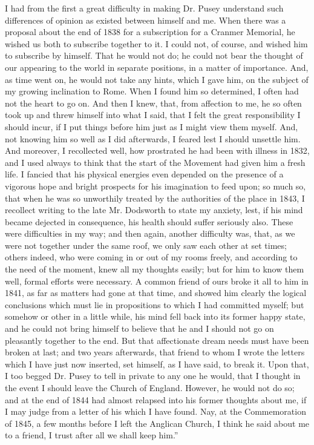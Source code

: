 I had from the first a great difficulty in making Dr. Pusey
understand such differences of opinion as existed between himself and
me. When there was a proposal about the end of 1838 for a subscription
for a Cranmer Memorial, he wished us both to subscribe together to it.
I could not, of course, and wished him to subscribe by himself. That he
would not do; he could not bear the thought of our appearing to the
world in separate positions, in a matter of importance. And, as time
went on, he would not take any hints, which I gave him, on the subject
of my growing inclination to Rome. When I found him so determined, I
often had not the heart to go on. And then I knew, that, from affection
to me, he so often took up and threw himself into what I said,
that I felt the great responsibility I should incur, if I put things
before him just as I might view them myself. And, not knowing
him so well as I did afterwards, I feared lest I should unsettle him.
And moreover, I recollected well, how prostrated he had been with
illness in 1832, and I used always to think that the start of the
Movement had given him a fresh life. I fancied that his physical
energies even depended on the presence of a vigorous hope and bright
prospects for his imagination to feed upon; so much so, that when he was
so unworthily treated by the authorities of the place in 1843, I
recollect writing to the late Mr. Dodsworth to state my anxiety, lest,
if his mind became dejected in consequence, his health should
suffer seriously also. These were difficulties in my way; and then
again, another difficulty was, that, as we were not together under the
same roof, we only saw each other at set times; others indeed, who were
coming in or out of my rooms freely, and according to the need of the moment, knew all my thoughts easily; but for him to know them
well, formal efforts were necessary. A common friend of ours broke it
all to him in 1841, as far as matters had gone at that time, and showed
him clearly the logical conclusions which must lie in propositions to
which I had committed myself; but somehow or other in a little while,
his mind fell back into its former happy state, and he could not bring
himself to believe that he and I should not go on pleasantly together to
the end. But that affectionate dream needs must have been broken at
last; and two years afterwards, that friend to whom I wrote the letters
which I have just now inserted, set himself, as I have said, to break
it. Upon that, I too begged Dr. Pusey to tell in private to any one he
would, that I thought in the event I should leave the Church of England.
However, he would not do so; and at the end of 1844 had almost relapsed
into his former thoughts about me, if I may judge from a letter of his
which I have found. Nay, at the Commemoration of 1845, a few months
before I left the Anglican Church, I think he said about me to a friend,
I trust after all we shall keep him.''

